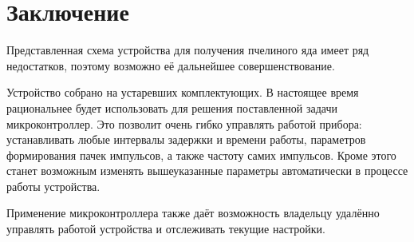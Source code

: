 \section{Заключение}

Представленная схема устройства для получения пчелиного яда имеет ряд недостатков, поэтому  возможно её дальнейшее совершенствование.

Устройство собрано на устаревших комплектующих. В настоящее время рациональнее будет использовать для решения поставленной задачи микроконтроллер. Это позволит очень гибко управлять работой прибора:
устанавливать любые интервалы задержки и времени работы, параметров формирования пачек импульсов, а также частоту самих импульсов. Кроме этого станет возможным изменять вышеуказанные параметры автоматически в процессе работы устройства.

Применение микроконтроллера также даёт возможность владельцу удалённо управлять работой устройства и отслеживать текущие настройки.
